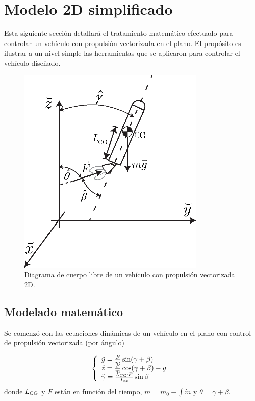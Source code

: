 
\section{Modelo 2D simplificado} \label{sec:model2d}

Esta siguiente sección detallará el tratamiento matemático efectuado para controlar un vehículo con propulsión vectorizada en el plano. El propósito es ilustrar a un nivel simple las herramientas que se aplicaron para controlar el vehículo diseñado.

\begin{figure}[htb!]
	\centering
	\includegraphics[width=9cm]{fig/rocketFBD.eps}
	\caption{Diagrama de cuerpo libre de un vehículo con propulsión vectorizada 2D.}
	\label{fig:FBD2D}
\end{figure}


\subsection{Modelado matemático}
Se comenzó con las ecuaciones dinámicas de un vehículo en el plano con control de propulsión vectorizada (por ángulo)

\[
\left\{
\begin{array}{l}
	\ddot{y}=\frac{F}{m} \sin(\gamma+\beta) \\
	\ddot{z}=\frac{F}{m} \cos (\gamma+\beta)-g \\
	\ddot{\gamma} = \frac{L_{{\mathrm{CG}}}\cdot F}{I_{xx}}\sin\beta
\end{array}
\right.
\]
donde \(L_{\mathrm{CG}}\) y \(F\) están en función del tiempo, $m =m_0 - \int \dot{m} $ y $\theta = \gamma+\beta$. 

